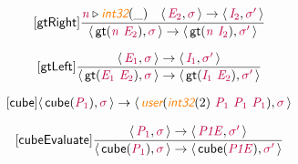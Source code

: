 \documentclass[10pt,leqno,fleqn]{article}
\newcommand{\artVariable}[1]{\mbox{\color{purple}\em #1\/}}
\newcommand{\artConstructor}[1]{\mbox{\sf #1}}
\newcommand{\artSpecial}[1]{\mbox{\color{orange}\sf\em #1}}
\begin{document}
\begin{equation}
\tag*{[\artConstructor{\sf gtRight}]}
\begin{split}\frac{ \artVariable{n}\triangleright \artSpecial{int32}(\_) \quad \langle\, \artVariable{E$_{2}$}, \artVariable{$\sigma$}\,\rangle \rightarrow \langle\, \artVariable{I$_{2}$}, \artVariable{$\sigma$\/$^\prime$}\,\rangle }{\langle\, \artConstructor{\sf gt}(\artVariable{n}\ \artVariable{E$_{2}$}), \artVariable{$\sigma$}\,\rangle \rightarrow \langle\, \artConstructor{\sf gt}(\artVariable{n}\ \artVariable{I$_{2}$}), \artVariable{$\sigma$\/$^\prime$}\,\rangle }
\end{split}
\end{equation}

\begin{equation}
\tag*{[\artConstructor{\sf gtLeft}]}
\begin{split}\frac{\langle\, \artVariable{E$_{1}$}, \artVariable{$\sigma$}\,\rangle \rightarrow \langle\, \artVariable{I$_{1}$}, \artVariable{$\sigma$\/$^\prime$}\,\rangle }{\langle\, \artConstructor{\sf gt}(\artVariable{E$_{1}$}\ \artVariable{E$_{2}$}), \artVariable{$\sigma$}\,\rangle \rightarrow \langle\, \artConstructor{\sf gt}(\artVariable{I$_{1}$}\ \artVariable{E$_{2}$}), \artVariable{$\sigma$\/$^\prime$}\,\rangle }
\end{split}
\end{equation}

\begin{equation}
\tag*{[\artConstructor{\sf cube}]}
\begin{split}\langle\, \artConstructor{\sf cube}(\artVariable{P$_{1}$}), \artVariable{$\sigma$}\,\rangle \rightarrow \langle\, \artSpecial{user}(\artSpecial{int32}(2)\ \artVariable{P$_{1}$}\ \artVariable{P$_{1}$}\ \artVariable{P$_{1}$}), \artVariable{$\sigma$}\,\rangle 
\end{split}
\end{equation}

\begin{equation}
\tag*{[\artConstructor{\sf cubeEvaluate}]}
\begin{split}\frac{\langle\, \artVariable{P$_{1}$}, \artVariable{$\sigma$}\,\rangle \rightarrow \langle\, \artVariable{P1E}, \artVariable{$\sigma$\/$^\prime$}\,\rangle }{\langle\, \artConstructor{\sf cube}(\artVariable{P$_{1}$}), \artVariable{$\sigma$}\,\rangle \rightarrow \langle\, \artConstructor{\sf cube}(\artVariable{P1E}), \artVariable{$\sigma$\/$^\prime$}\,\rangle }
\end{split}
\end{equation}
\end{document}
